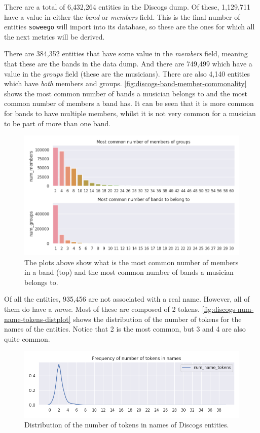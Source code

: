 \documentclass[epsfig,a4paper,11pt,titlepage,twoside,openany]{book}
\begin{document}
There are a total of 6,432,264 entities in the Discogs dump. Of these, 1,129,711 have a value in either the \textit{band} or \textit{members} field. This is the final number of entities \texttt{soweego} will import into its database, so these are the ones for which all the next metrics will be derived.

There are 384,352 entities that have some value in the \textit{members} field, meaning that these are the bands in the data dump. And there are 749,499 which have a value in the \textit{groups} field (these are the musicians). There are also 4,140 entities which have \textit{both} members and groups. \autoref{fig:discogs-band-member-commonality} shows the most common number of bands a musician belongs to and the most common number of members a band has. It can be seen that it is more common for bands to have multiple members, whilst it is not very common for a musician to be part of more than one band.

\begin{figure}[H]
  \centering \includegraphics[width=\textwidth]{discogs_band_belonging_barplots} 
  \caption{The plots above show what is the most common number of members in a band (top) and the most common number of bands a musician belongs to.}
  \label{fig:discogs-band-member-commonality}
\end{figure}

Of all the entities, 935,456 are not associated with a real name. However, all of them do have a \textit{name}. Most of these are composed of 2 tokens. \autoref{fig:discogs-num-name-tokens-distplot} shows the distribution of the number of tokens for the names of the entities. Notice that 2 is the most common, but 3 and 4 are also quite common.

\begin{figure}[H]
  \centering \includegraphics[width=\textwidth]{discogs_distribution_num_name_tokens} 
  \caption{Distribution of the number of tokens in names of Discogs entities.}
  \label{fig:discogs-num-name-tokens-distplot}
\end{figure}
\end{document}
